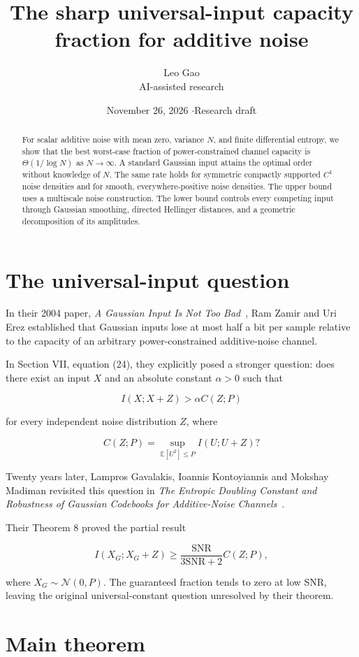 \documentclass[11pt]{article}
\title{The sharp universal-input capacity fraction for additive noise}
\author{Leo Gao\\[-1pt]{\small AI-assisted research}}
\date{November 26, 2026 \quad$\cdot$\quad Research draft}
\begin{document}
\maketitle
\begin{abstract}
For scalar additive noise with mean zero, variance $N$, and finite differential entropy, we show that the best worst-case fraction of power-constrained channel capacity is $\Theta(1/\log N)$ as $N\to\infty$. A standard Gaussian input attains the optimal order without knowledge of $N$. The same rate holds for symmetric compactly supported $C^1$ noise densities and for smooth, everywhere-positive noise densities. The upper bound uses a multiscale noise construction. The lower bound controls every competing input through Gaussian smoothing, directed Hellinger distances, and a geometric decomposition of its amplitudes.
\end{abstract}
\section{The universal-input question}

In their 2004 paper, \emph{A Gaussian Input Is Not Too Bad}~\cite{ZE}, Ram Zamir and Uri Erez established that Gaussian inputs lose at most half a bit per sample relative to the capacity of an arbitrary power-constrained additive-noise channel.

In Section VII, equation (24), they explicitly posed a stronger question: does there exist an input \(X\) and an absolute constant \(\alpha>0\) such that

\[
I(X;X+Z)>\alpha C(Z;P)
\]

for every independent noise distribution \(Z\), where

\[
C(Z;P)=
\sup_{\mathbb E[U^2]\le P} I(U;U+Z)?
\]

Twenty years later, Lampros Gavalakis, Ioannis Kontoyiannis and Mokshay Madiman revisited this question in \emph{The Entropic Doubling Constant and Robustness of Gaussian Codebooks for Additive-Noise Channels}~\cite{GKM}.

Their Theorem 8 proved the partial result

\[
I(X_G;X_G+Z)
\geq
\frac{\mathrm{SNR}}{3\mathrm{SNR}+2}C(Z;P),
\]

where \(X_G\sim\mathcal N(0,P)\). The guaranteed fraction tends to zero at low SNR, leaving the original universal-constant question unresolved by their theorem.

\section{Main theorem}
\end{document}
